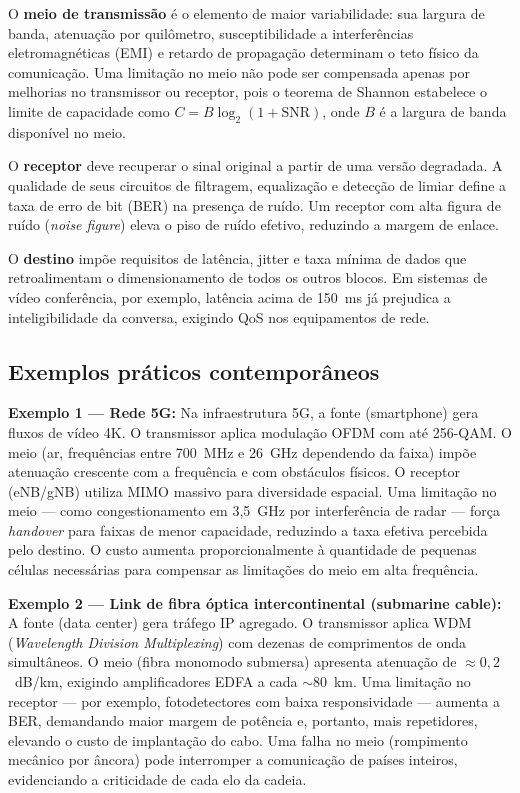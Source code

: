 \documentclass[conference]{IEEEtran}
\begin{document}
O \textbf{meio de transmissão} é o elemento de maior variabilidade: sua largura de banda,
atenuação por quilômetro, susceptibilidade a interferências eletromagnéticas (EMI) e retardo
de propagação determinam o teto físico da comunicação. Uma limitação no meio não pode ser
compensada apenas por melhorias no transmissor ou receptor, pois o teorema de Shannon estabelece
o limite de capacidade como $C = B \log_2(1 + \text{SNR})$, onde $B$ é a largura de banda
disponível no meio.

O \textbf{receptor} deve recuperar o sinal original a partir de uma versão degradada. A qualidade
de seus circuitos de filtragem, equalização e detecção de limiar define a taxa de erro de bit
(BER) na presença de ruído. Um receptor com alta figura de ruído (\textit{noise figure}) eleva
o piso de ruído efetivo, reduzindo a margem de enlace.

O \textbf{destino} impõe requisitos de latência, jitter e taxa mínima de dados que retroalimentam
o dimensionamento de todos os outros blocos. Em sistemas de vídeo conferência, por exemplo,
latência acima de 150~ms já prejudica a inteligibilidade da conversa, exigindo QoS nos
equipamentos de rede.

\subsection*{Exemplos práticos contemporâneos}

\textbf{Exemplo 1 --- Rede 5G:} Na infraestrutura 5G, a fonte (smartphone) gera fluxos de
vídeo 4K. O transmissor aplica modulação OFDM com até 256-QAM. O meio (ar, frequências entre
700~MHz e 26~GHz dependendo da faixa) impõe atenuação crescente com a frequência e com
obstáculos físicos. O receptor (eNB/gNB) utiliza MIMO massivo para diversidade espacial. Uma
limitação no meio --- como congestionamento em 3,5~GHz por interferência de radar --- força
\textit{handover} para faixas de menor capacidade, reduzindo a taxa efetiva percebida pelo
destino. O custo aumenta proporcionalmente à quantidade de pequenas células necessárias para
compensar as limitações do meio em alta frequência.

\textbf{Exemplo 2 --- Link de fibra óptica intercontinental (submarine cable):} A fonte
(data center) gera tráfego IP agregado. O transmissor aplica WDM (\textit{Wavelength Division
Multiplexing}) com dezenas de comprimentos de onda simultâneos. O meio (fibra monomodo
submersa) apresenta atenuação de $\approx 0{,}2$~dB/km, exigindo amplificadores EDFA a cada
$\sim$80~km. Uma limitação no receptor --- por exemplo, fotodetectores com baixa
responsividade --- aumenta a BER, demandando maior margem de potência e, portanto, mais
repetidores, elevando o custo de implantação do cabo. Uma falha no meio (rompimento mecânico
por âncora) pode interromper a comunicação de países inteiros, evidenciando a criticidade de
cada elo da cadeia.
\end{document}
